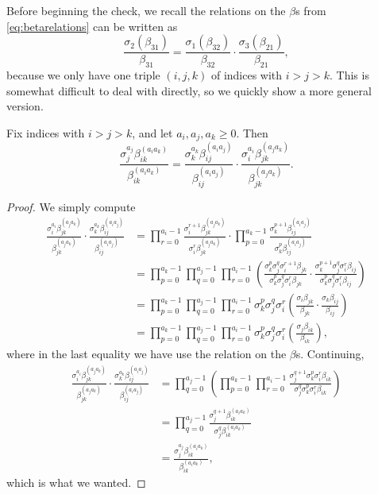 Before beginning the check, we recall the relations on the $\beta$s from \autoref{eq:betarelations} can be written as
\[\frac{\sigma_2(\beta_{31})}{\beta_{31}}=\frac{\sigma_1(\beta_{32})}{\beta_{32}}\cdot\frac{\sigma_3(\beta_{21})}{\beta_{21}},\]
because we only have one triple $(i,j,k)$ of indices with $i>j>k$. This is somewhat difficult to deal with directly, so we quickly show a more general version.
\begin{lemma} \label{lem:betterbetarelation}
	Fix indices with $i>j>k$, and let $a_i,a_j,a_k\ge0$. Then
	\[\frac{\sigma_j^{a_j}\beta_{ik}^{(a_ia_k)}}{\beta_{ik}^{(a_ia_k)}}=\frac{\sigma_k^{a_k}\beta_{ij}^{(a_ia_j)}}{\beta_{ij}^{(a_ia_j)}}\cdot\frac{\sigma_i^{a_i}\beta_{jk}^{(a_ja_k)}}{\beta_{jk}^{(a_ja_k)}}.\]
\end{lemma}
\begin{proof}
	We simply compute
	\begin{align*}
		\frac{\sigma_i^{a_i}\beta_{jk}^{(a_ja_k)}}{\beta_{jk}^{(a_ja_k)}}\cdot\frac{\sigma_k^{a_k}\beta_{ij}^{(a_ia_j)}}{\beta_{ij}^{(a_ia_j)}} &= \prod_{r=0}^{a_i-1}\frac{\sigma_i^{r+1}\beta_{jk}^{(a_ja_k)}}{\sigma_i^r\beta_{jk}^{(a_ja_k)}}\cdot\prod_{p=0}^{a_k-1}\frac{\sigma_k^{p+1}\beta_{ij}^{(a_ia_j)}}{\sigma_k^p\beta_{ij}^{(a_ia_j)}} \\
		&= \prod_{p=0}^{a_k-1}\prod_{q=0}^{a_j-1}\prod_{r=0}^{a_i-1}\left(\frac{\sigma_k^p\sigma_j^q\sigma_i^{r+1}\beta_{jk}}{\sigma_k^p\sigma_j^q\sigma_i^r\beta_{jk}}\cdot\frac{\sigma_k^{p+1}\sigma_j^q\sigma_i^r\beta_{ij}}{\sigma_k^p\sigma_j^q\sigma_i^r\beta_{ij}}\right) \\
		&= \prod_{p=0}^{a_k-1}\prod_{q=0}^{a_j-1}\prod_{r=0}^{a_i-1}\sigma_k^p\sigma_j^q\sigma_i^r\left(\frac{\sigma_i\beta_{jk}}{\beta_{jk}}\cdot\frac{\sigma_k\beta_{ij}}{\beta_{ij}}\right) \\
		&= \prod_{p=0}^{a_k-1}\prod_{q=0}^{a_j-1}\prod_{r=0}^{a_i-1}\sigma_k^p\sigma_j^q\sigma_i^r\left(\frac{\sigma_j\beta_{ik}}{\beta_{ik}}\right),
	\end{align*}
	where in the last equality we have use the relation on the $\beta$s. Continuing,
	\begin{align*}
		\frac{\sigma_i^{a_i}\beta_{jk}^{(a_ja_k)}}{\beta_{jk}^{(a_ja_k)}}\cdot\frac{\sigma_k^{a_k}\beta_{ij}^{(a_ia_j)}}{\beta_{ij}^{(a_ia_j)}} &= \prod_{q=0}^{a_j-1}\left(\prod_{p=0}^{a_k-1}\prod_{r=0}^{a_i-1}\frac{\sigma_j^{q+1}\sigma_k^p\sigma_i^r\beta_{ik}}{\sigma_j^q\sigma_k^p\sigma_i^r\beta_{ik}}\right) \\
		&= \prod_{q=0}^{a_j-1}\frac{\sigma_j^{q+1}\beta_{ik}^{(a_ia_k)}}{\sigma_j^q\beta_{ik}^{(a_ia_k)}} \\
		&= \frac{\sigma_j^{a_j}\beta_{ik}^{(a_ia_k)}}{\beta_{ik}^{(a_ia_k)}},
	\end{align*}
	which is what we wanted.
\end{proof}
